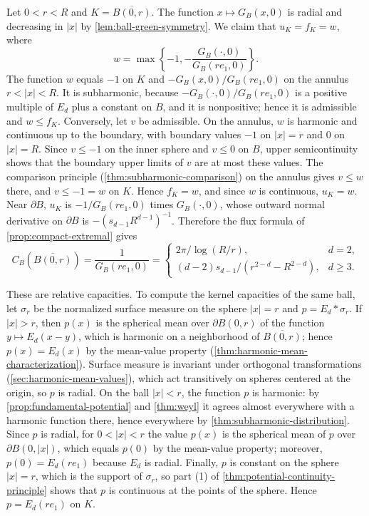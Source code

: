\begin{example}\label{ex:capacity-balls}
Let $0<r<R$ and $K=\overline{B(0,r)}$. The function $x\mapsto G_B(x,0)$ is radial and decreasing in $|x|$ by \cref{lem:ball-green-symmetry}. We claim that $u_K=f_K=w$, where
\[
 w=\max\left\{-1,-\frac{G_B(\cdot,0)}{G_B(re_1,0)}\right\}.
\]
The function $w$ equals $-1$ on $K$ and $-G_B(x,0)/G_B(re_1,0)$ on the annulus $r<|x|<R$. It is subharmonic, because $-G_B(\cdot,0)/G_B(re_1,0)$ is a positive multiple of $E_d$ plus a constant on $B$, and it is nonpositive; hence it is admissible and $w\leq f_K$. Conversely, let $v$ be admissible. On the annulus, $w$ is harmonic and continuous up to the boundary, with boundary values $-1$ on $|x|=r$ and $0$ on $|x|=R$. Since $v\leq-1$ on the inner sphere and $v\leq0$ on $B$, upper semicontinuity shows that the boundary upper limits of $v$ are at most these values. The comparison principle (\cref{thm:subharmonic-comparison}) on the annulus gives $v\leq w$ there, and $v\leq-1=w$ on $K$. Hence $f_K=w$, and since $w$ is continuous, $u_K=w$. Near $\partial B$, $u_K$ is $-1/G_B(re_1,0)$ times $G_B(\cdot,0)$, whose outward normal derivative on $\partial B$ is $-(s_{d-1}R^{d-1})^{-1}$. Therefore the flux formula of \cref{prop:compact-extremal} gives
\[
 C_B(\overline{B(0,r)})=\frac{1}{G_B(re_1,0)}=
 \begin{cases}
  2\pi/\log(R/r),&d=2,\\
  (d-2)s_{d-1}/(r^{2-d}-R^{2-d}),&d\geq3.
 \end{cases}
\]

These are relative capacities. To compute the kernel capacities of the same ball, let $\sigma_r$ be the normalized surface measure on the sphere $|x|=r$ and $p=E_d*\sigma_r$. If $|x|>r$, then $p(x)$ is the spherical mean over $\partial B(0,r)$ of the function $y\mapsto E_d(x-y)$, which is harmonic on a neighborhood of $\overline{B(0,r)}$; hence $p(x)=E_d(x)$ by the mean-value property (\cref{thm:harmonic-mean-characterization}). Surface measure is invariant under orthogonal transformations (\cref{sec:harmonic-mean-values}), which act transitively on spheres centered at the origin, so $p$ is radial. On the ball $|x|<r$, the function $p$ is harmonic: by \cref{prop:fundamental-potential} and \cref{thm:weyl} it agrees almost everywhere with a harmonic function there, hence everywhere by \cref{thm:subharmonic-distribution}. Since $p$ is radial, for $0<|x|<r$ the value $p(x)$ is the spherical mean of $p$ over $\partial B(0,|x|)$, which equals $p(0)$ by the mean-value property; moreover, $p(0)=E_d(re_1)$ because $E_d$ is radial. Finally, $p$ is constant on the sphere $|x|=r$, which is the support of $\sigma_r$, so part (1) of \cref{thm:potential-continuity-principle} shows that $p$ is continuous at the points of the sphere. Hence $p=E_d(re_1)$ on $K$.


\end{example}
